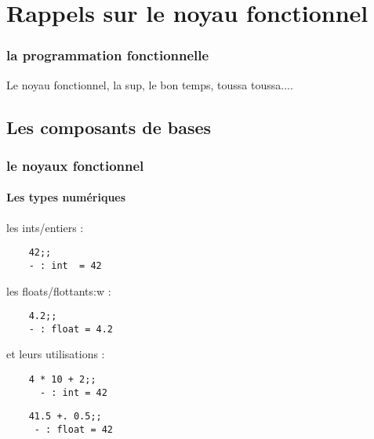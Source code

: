 \section{Rappels sur le noyau fonctionnel}
\begin{frame}
  \begin{center}
    \frametitle{la programmation fonctionnelle}
  Le noyau fonctionnel, la sup, le bon temps, toussa toussa....
  \end{center}
\end{frame}

\subsection{Les composants de bases}

\begin{frame}[fragile]
  \frametitle{le noyaux fonctionnel}
  \framesubtitle{Les types numériques}
   \begin{minipage}[t]{5cm}
    les ints/entiers : 
    \begin{lstlisting}
    42;;
    - : int  = 42
    \end{lstlisting}
   \end{minipage}
   \begin{minipage}[t]{5cm}
    les floats/flottants:w :
    \begin{lstlisting}
    4.2;;
    - : float = 4.2
    \end{lstlisting}
   \end{minipage}
   \vspace{0.5cm}
    et leurs utilisations :\\
   \begin{minipage}[t]{5cm}
     \begin{lstlisting}
    4 * 10 + 2;;
      - : int = 42
     \end{lstlisting}
   \end{minipage}
   \begin{minipage}[t]{5cm}
     \begin{lstlisting}
    41.5 +. 0.5;;
     - : float = 42
     \end{lstlisting}
   \end{minipage}
\end{frame}
